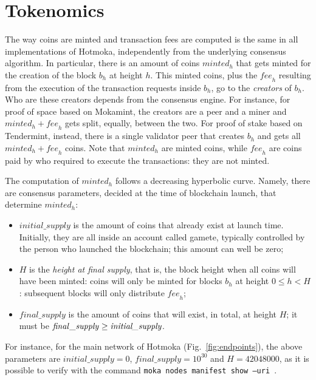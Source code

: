 \section{Tokenomics}\label{sec:tokenomics}

The way coins are minted and transaction fees are computed is the same in all implementations
of Hotmoka, independently from the underlying consensus algorithm. In particular,
there is an amount of coins $\mathit{minted}_h$ that gets minted for the creation of the
block $b_h$ at height $h$. This minted coins, plus the
$\mathit{fee}_h$ resulting from the execution of the transaction requests inside $b_h$,
go to the \emph{creators} of $b_h$. Who are these creators depends from the
consensus engine. For instance, for proof of space based on Mokamint, the creators are
a peer and a miner and $\mathit{minted}_h+\mathit{fee}_h$ gets split, equally, between the two.
For proof of stake based on Tendermint, instead, there is a single validator peer that creates
$b_h$ and gets all $\mathit{minted}_h+\mathit{fee}_h$ coins. Note that $\mathit{minted}_h$
are minted coins, while $\mathit{fee}_h$ are coins paid by who required to execute the
transactions: they are not minted.

The computation of $\mathit{minted}_h$ follows a decreasing hyperbolic curve. Namely, there
are consensus parameters, decided at the time of blockchain launch, that determine
$\mathit{minted}_h$:
%
\begin{itemize}
\item $\mathit{initial\_supply}$ is the amount of coins that already exist at launch time.
Initially, they are all inside an account called gamete, typically
controlled by the person who launched the blockchain; this amount can well be zero;
\item $H$ is the \emph{height at final supply}, that is, the block height when all coins
will have been minted: coins will only be minted for blocks $b_h$ at height $0\le h<H$:
subsequent blocks will only distribute $\mathit{fee}_h$;
\item $\mathit{final\_supply}$ is the amount of coins that will exist, in total, at height $H$;
it must be $\mathit{final\_supply}\ge\emph{initial\_supply}$.
\end{itemize}
%
For instance, for the main network \texttt{\serverMokamintMainChainId{}} of Hotmoka (Fig.~\ref{fig:endpoints}),
the above parameters are $\mathit{initial\_supply}=0$, $\mathit{final\_supply}=10^{30}$
and $H=42048000$, as it is possible to verify with the command
\texttt{moka nodes manifest show --uri \serverMokamintMain{}}.

